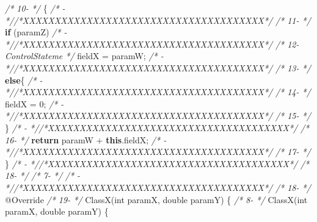 \documentclass[
]{article}
\newenvironment{Shaded}{\begin{snugshade}}{\end{snugshade}}
\newcommand{\AttributeTok}[1]{\textcolor[rgb]{0.77,0.63,0.00}{#1}}
\newcommand{\CommentTok}[1]{\textcolor[rgb]{0.56,0.35,0.01}{\textit{#1}}}
\newcommand{\DataTypeTok}[1]{\textcolor[rgb]{0.13,0.29,0.53}{#1}}
\newcommand{\DecValTok}[1]{\textcolor[rgb]{0.00,0.00,0.81}{#1}}
\newcommand{\FunctionTok}[1]{\textcolor[rgb]{0.00,0.00,0.00}{#1}}
\newcommand{\KeywordTok}[1]{\textcolor[rgb]{0.13,0.29,0.53}{\textbf{#1}}}
\newcommand{\NormalTok}[1]{#1}
\begin{document}
\begin{landscape}
\begin{Shaded}
\begin{Highlighting}[]
\CommentTok{/* 10-                 */}\NormalTok{    \{                                                          }\CommentTok{/*   -                 *//*XXXXXXXXXXXXXXXXXXXXXXXXXXXXXXXXXXXXXX*/}                     
\CommentTok{/* 11-                 */}        \KeywordTok{if}\NormalTok{ (paramZ)                                            }\CommentTok{/*   -                 *//*XXXXXXXXXXXXXXXXXXXXXXXXXXXXXXXXXXXXXX*/}                     
\CommentTok{/* 12-ControlStateme   */}\NormalTok{            fieldX = paramW;                                   }\CommentTok{/*   -                 *//*XXXXXXXXXXXXXXXXXXXXXXXXXXXXXXXXXXXXXX*/}                     
\CommentTok{/* 13-                 */}        \KeywordTok{else}\NormalTok{\{                                                  }\CommentTok{/*   -                 *//*XXXXXXXXXXXXXXXXXXXXXXXXXXXXXXXXXXXXXX*/}                     
\CommentTok{/* 14-                 */}\NormalTok{            fieldX = }\DecValTok{0}\NormalTok{;                                        }\CommentTok{/*   -                 *//*XXXXXXXXXXXXXXXXXXXXXXXXXXXXXXXXXXXXXX*/}                     
\CommentTok{/* 15-                 */}\NormalTok{        \}                                                      }\CommentTok{/*   -                 *//*XXXXXXXXXXXXXXXXXXXXXXXXXXXXXXXXXXXXXX*/}                     
\CommentTok{/* 16-                 */}        \KeywordTok{return}\NormalTok{ paramW + }\KeywordTok{this}\NormalTok{.}\FunctionTok{fieldX}\NormalTok{;                           }\CommentTok{/*   -                 *//*XXXXXXXXXXXXXXXXXXXXXXXXXXXXXXXXXXXXXX*/}                     
\CommentTok{/* 17-                 */}\NormalTok{     \}                                                         }\CommentTok{/*   -                 *//*XXXXXXXXXXXXXXXXXXXXXXXXXXXXXXXXXXXXXX*/}                     
\CommentTok{/* 18-                 */}                                                               \CommentTok{/*  7-                 */}                                                               
\CommentTok{/*   -                 *//*XXXXXXXXXXXXXXXXXXXXXXXXXXXXXXXXXXXXXX*/}                     \CommentTok{/* 18-                 */}    \AttributeTok{@Override}                                                  
\CommentTok{/* 19-                 */}    \FunctionTok{ClassX}\NormalTok{(}\DataTypeTok{int}\NormalTok{ paramX, }\DataTypeTok{double}\NormalTok{ paramY) \{                                }\CommentTok{/*  8-                 */}    \FunctionTok{ClassX}\NormalTok{(}\DataTypeTok{int}\NormalTok{ paramX, }\DataTypeTok{double}\NormalTok{ paramY) \{                                }

\end{Highlighting}
\end{Shaded}
\end{landscape}
\end{document}
